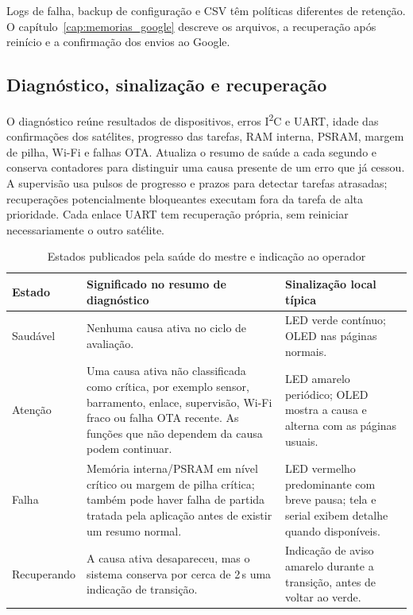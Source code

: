 Logs de falha, backup de configuração e CSV têm políticas diferentes de retenção. O capítulo~\ref{cap:memorias_google} descreve os arquivos, a recuperação após reinício e a confirmação dos envios ao Google.

\subsection{Diagnóstico, sinalização e recuperação}
O diagnóstico reúne resultados de dispositivos, erros I\textsuperscript{2}C e UART, idade das confirmações dos satélites, progresso das tarefas, RAM interna, PSRAM, margem de pilha, Wi-Fi e falhas OTA. Atualiza o resumo de saúde a cada segundo e conserva contadores para distinguir uma causa presente de um erro que já cessou. A supervisão usa pulsos de progresso e prazos para detectar tarefas atrasadas; recuperações potencialmente bloqueantes executam fora da tarefa de alta prioridade. Cada enlace UART tem recuperação própria, sem reiniciar necessariamente o outro satélite.

\begin{table}[htbp]\centering\small
\caption{Estados publicados pela saúde do mestre e indicação ao operador}\label{tab:estados-saude-firmware}
\begin{tabularx}{\textwidth}{@{}p{2.4cm}X p{4.4cm}@{}}\toprule
Estado & Significado no resumo de diagnóstico & Sinalização local típica\\\midrule
Saudável & Nenhuma causa ativa no ciclo de avaliação. & LED verde contínuo; OLED nas páginas normais.\\
Atenção & Uma causa ativa não classificada como crítica, por exemplo sensor, barramento, enlace, supervisão, Wi-Fi fraco ou falha OTA recente. As funções que não dependem da causa podem continuar. & LED amarelo periódico; OLED mostra a causa e alterna com as páginas usuais.\\
Falha & Memória interna/PSRAM em nível crítico ou margem de pilha crítica; também pode haver falha de partida tratada pela aplicação antes de existir um resumo normal. & LED vermelho predominante com breve pausa; tela e serial exibem detalhe quando disponíveis.\\
Recuperando & A causa ativa desapareceu, mas o sistema conserva por cerca de 2\,s uma indicação de transição. & Indicação de aviso amarelo durante a transição, antes de voltar ao verde.\\\bottomrule
\end{tabularx}\end{table}

